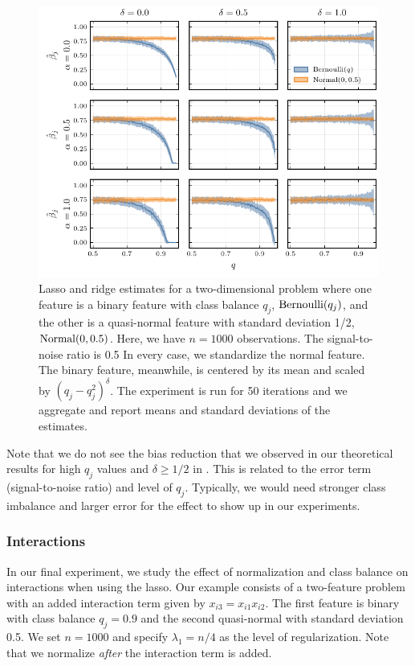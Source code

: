 \begin{figure}[htpb]
  \centering
  \includegraphics{plots/mixed_data.pdf}
  \caption{%
    Lasso and ridge estimates for a two-dimensional problem where one feature is a binary feature with class balance \(q_j\), \(\operatorname{Bernoulli}(q_j)\), and the other is a quasi-normal feature with standard deviation 1/2, \(\operatorname{Normal}(0, 0.5)\). Here, we have \(n = \num{1000}\) observations. The signal-to-noise ratio is 0.5 In every case, we standardize the normal feature. The binary feature, meanwhile, is centered by its mean and scaled by \((q_j-q_j^2)^\delta\). The experiment is run for 50 iterations and we aggregate and report means and standard deviations of the estimates.}
  \label{fig:lasso-ridge-comparison}
\end{figure}

Note that we do not see the bias reduction that we observed in our theoretical results for
high \(q_j\) values and \(\delta \geq 1/2\) in . This is
related to the error term (signal-to-noise ratio) and level of \(q_j\). Typically, we would
need stronger class imbalance and larger error for the effect to show up in our
experiments.

\subsubsection{Interactions}\label{sec:experiments-interactions}

In our final experiment, we study the effect of normalization and class balance on
interactions when using the lasso. Our example consists of a two-feature problem with an
added interaction term given by \(x_{i3} = x_{i1}x_{i2}\). The first feature is binary with
class balance \(q_j=0.9\) and the second quasi-normal with standard deviation 0.5. We set
\(n=1000\) and specify \(\lambda_1 = n/4\) as the level of regularization. Note that we
normalize \emph{after} the interaction term is added.

